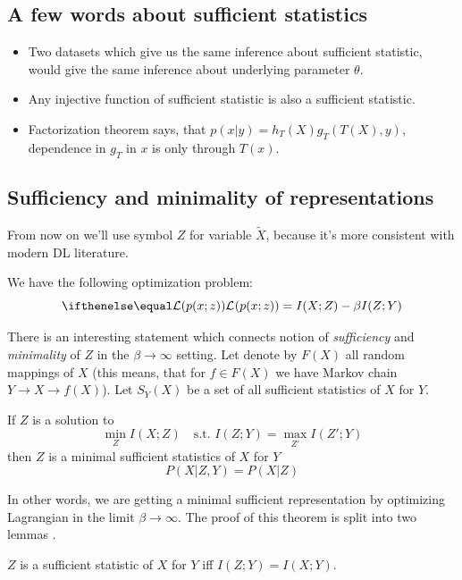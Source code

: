 \documentclass{article}
\begin{document}
\subsection{A few words about sufficient statistics}
\begin{itemize}
    \item Two datasets which give us the same inference about sufficient statistic, would give the same inference about underlying parameter $\theta$.
    \item Any injective function of sufficient statistic is also a sufficient statistic.
    \item Factorization theorem says, that $p(x|y) = h_T(X) g_T(T(X), y)$, dependence in $g_T$ in $x$ is only through $T(x)$.
\end{itemize}

\subsection{Sufficiency and minimality of representations}
From now on we'll use symbol $Z$ for variable $\tilde{X}$, because it's more consistent with modern DL literature.

We have the following optimization problem:
\[
\loss{p(x;z)} = I(X;Z) - \beta I(Z; Y)
\]

There is an interesting statement which connects notion of \textit{sufficiency} and \textit{minimality} of $Z$ in the $\beta \to \infty$ setting.
Let denote by $F(X)$ all random mappings of $X$ (this means, that for $f \in F(X)$ we have Markov chain $Y \to X \to f(X)$).
Let $S_Y(X)$ be a set of all sufficient statistics of $X$ for $Y$.

\begin{proposition}
If $Z$ is a solution to
\[
\min_{Z} I(X; Z) \quad\text{s.t. } I(Z;Y) = \max_{Z'} I(Z'; Y)
\]
then $Z$ is a minimal sufficient statistics of $X$ for $Y$
\[
P(X|Z,Y) = P(X|Z)
\]
\end{proposition}

In other words, we are getting a minimal sufficient representation by optimizing Lagrangian in the limit $\beta \to \infty$.
The proof of this theorem is split into two lemmas \cite{IB_learning_and_generalization}.

\begin{lemma}
    $Z$ is a sufficient statistic of $X$ for $Y$ iff $I(Z;Y) = I(X;Y)$.
\end{lemma}
\end{document}
